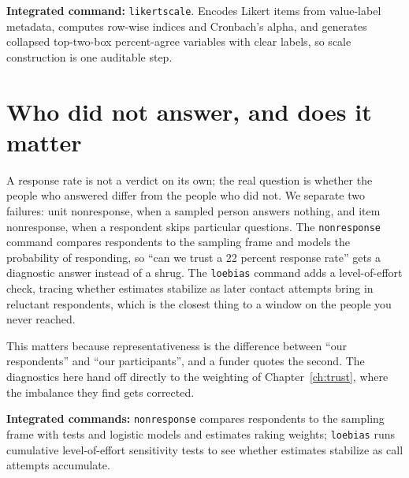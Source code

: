 \documentclass[
    a4paper,
    fontsize=10pt,
    twoside=true,
    numbers=noenddot,
]{kaobook}
\begin{document}
\begin{kaobox}[frametitle=Package Integration: \texttt{likertscale}]
\textbf{Integrated command:} \texttt{likertscale}. Encodes Likert items from value-label metadata, computes row-wise indices and Cronbach's alpha, and generates collapsed top-two-box percent-agree variables with clear labels, so scale construction is one auditable step.
\end{kaobox}

\section{Who did not answer, and does it matter}
A response rate is not a verdict on its own; the real question is whether the people who answered differ from the people who did not. We separate two failures: unit nonresponse, when a sampled person answers nothing, and item nonresponse, when a respondent skips particular questions. The \texttt{nonresponse} command compares respondents to the sampling frame and models the probability of responding, so \enquote{can we trust a 22 percent response rate} gets a diagnostic answer instead of a shrug. The \texttt{loebias} command adds a level-of-effort check, tracing whether estimates stabilize as later contact attempts bring in reluctant respondents, which is the closest thing to a window on the people you never reached.

This matters because representativeness is the difference between \enquote{our respondents} and \enquote{our participants}, and a funder quotes the second. The diagnostics here hand off directly to the weighting of Chapter~\ref{ch:trust}, where the imbalance they find gets corrected.

\begin{kaobox}[frametitle=Package Integration: \texttt{nonresponse} and \texttt{loebias}]
\textbf{Integrated commands:} \texttt{nonresponse} compares respondents to the sampling frame with tests and logistic models and estimates raking weights; \texttt{loebias} runs cumulative level-of-effort sensitivity tests to see whether estimates stabilize as call attempts accumulate.
\end{kaobox}
\end{document}
